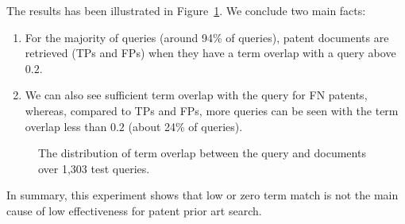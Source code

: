 The results has been illustrated in Figure~\ref{fig:overlap}. We conclude two main facts:
\begin{enumerate}
\item For the majority of queries (around 94\% of queries), patent documents are retrieved (TPs and FPs) when they have a term overlap with a query above $ 0.2 $.
\item We can also see sufficient term overlap with the query for FN patents, whereas, compared to TPs and FPs, more queries can be seen with the term overlap less than $ 0.2 $ (about 24\% of queries). 
\end{enumerate}
 
\begin{figure}[t!]
\begin{centering}
\par\end{centering}

\protect\caption{The distribution of term overlap between the query and documents over 1,303 test queries.}
\label{fig:overlap}
\end{figure}
In summary, this experiment shows that low or zero term match is not the main cause of low effectiveness for patent prior art search.
